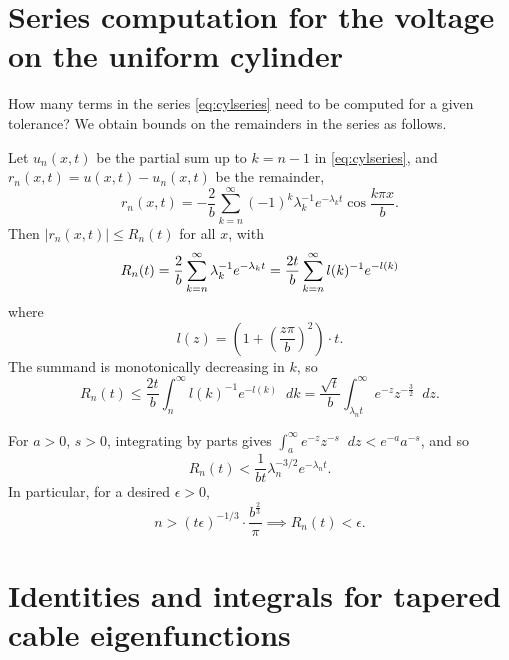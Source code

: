 \documentclass[parskip=half]{scrartcl}
\newcommand{\Int}[2]{\int_{#1}^{#2}\!}
\newcommand{\D}{\mathop{}\!d}
\theoremstyle{nonumberplain}
\begin{document}
\newpage
\appendix
\section{Series computation for the voltage on the uniform cylinder}
\label{ap:cylcomp}

How many terms in the series \eqref{eq:cylseries} need to be computed for a given tolerance?
We obtain bounds on the remainders in the series as follows.

Let $u_n(x,t)$ be the partial sum up to $k=n-1$ in \eqref{eq:cylseries}, and $r_n(x,t) = u(x,t) - u_n(x,t)$
be the remainder,
\begin{equation}
    r_n(x,t) = -\frac{2}{b}\sum_{k=n}^{\infty} (-1)^k\lambda_k^{-1}e^{-\lambda_k t}\cos\frac{k\pi x}{b}.
\end{equation}
Then $|r_n(x,t)|\leq R_n(t)$ for all $x$, with
\begin{equation}
    R_n(t) = \frac{2}{b}\sum_{k=n}^{\infty} \lambda_k^{-1}e^{-\lambda_k t}\\
    = \frac{2t}{b}\sum_{k=n}^{\infty} l(k)^{-1}e^{-l(k)}\\
\end{equation}
where
\[
    l(z) = \left(1+\left(\frac{z\pi}{b}\right)^2\right)\cdot t.
\]
The summand is monotonically decreasing in $k$, so
\begin{equation}
    \label{eq:rnigamma}
    R_n(t)
    \leq \frac{2t}{b}\Int{n}{\infty} l(k)^{-1}e^{-l(k)}\D k
    = \frac{\sqrt{t}}{b} \Int{\lambda_n t}{\infty} e^{-z}z^{-\frac{3}{2}} \D z.
\end{equation}

For $a>0$, $s>0$, integrating by parts gives
$\displaystyle \Int{a}{\infty} e^{-z}z^{-s}\D z < e^{-a}a^{-s}$,
and so
\begin{equation}
    R_n(t) < \frac{1}{b t}\lambda_n^{-3/2}e^{-\lambda_n t}.
\end{equation}
In particular, for a desired $\epsilon>0$,
\begin{equation}
    n > (t \epsilon)^{-1/3}\cdot\frac{b^\frac{2}{3}}{\pi}
    \implies
    R_n(t) < \epsilon.
\end{equation}

\section{Identities and integrals for tapered cable eigenfunctions}
\label{ap:conid}

\newcommand{\cZ}{\mathcal{Z}}
\newcommand{\cC}{\mathcal{C}}
\end{document}
